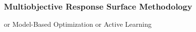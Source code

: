 \documentclass[aspectratio=169]{beamer}
\begin{document}
\begin{frame}\frametitle{Multiobjective Response Surface Methodology}
{or Model-Based Optimization or Active Learning}
\begin{columns}
\begin{column}{0.4\textwidth}
\begin{center}
\medskip
\vskip 0.5cm
\medskip
{}
\end{center}
\end{column}
\begin{column}{0.2\textwidth}
\begin{center}
\\
\vskip 1.2cm
\\
\vskip 1cm
\end{center}
\end{column}
\begin{column}{0.4\textwidth}
\begin{center}

\end{center}
\end{column}
\end{columns}
\end{frame}
\end{document}
